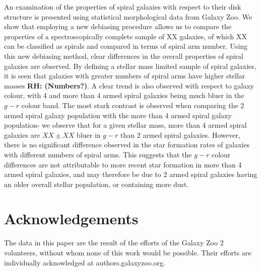 \documentclass[useAMS,usenatbib]{mn2e}
\newcommand{\rh}[1]{{\bf \textcolor{RoyalPurple}{RH: #1}}}
\begin{document}
An examination of the properties of spiral galaxies with respect to their disk structure is presented using statistical morphological data from Galaxy Zoo. We show that employing a new debiasing procedure allows us to compare the properties of a spectroscopically complete sample of XX galaxies, of which XX can be classified as spirals and compared in terms of spiral arm number. Using this new debiasing method, clear differences in the overall properties of spiral galaxies are observed. By defining a stellar mass limited sample of spiral galaxies, it is seen that galaxies with greater numbers of spiral arms have higher stellar masses \rh{(Numbers?)}. A clear trend is also observed with respect to galaxy colour, with 4 and more than 4 armed spiral galaxies being much bluer in the $g-r$ colour band. The most stark contrast is observed when comparing the 2 armed spiral galaxy population with the more than 4 armed spiral galaxy population- we observe that for a given stellar mass, more than 4 armed spiral galaxies are $XX \pm XX$ bluer in $g-r$ than 2 armed spiral galaxies. However, there is no significant difference observed in the star formation rates of galaxies with different numbers of spiral arms. This suggests  that the $g-r$ colour differences are not attributable to more recent star formation in more than 4 armed spiral galaxies, and may therefore be due to 2 armed spiral galaxies having an older overall stellar population, or containing more dust.  


\section{Acknowledgements}

The data in this paper are the result of the efforts of the Galaxy Zoo 2 volunteers, without whom none of this work would be possible. Their efforts are individually acknowledged at authors.galaxyzoo.org.




\end{document}
